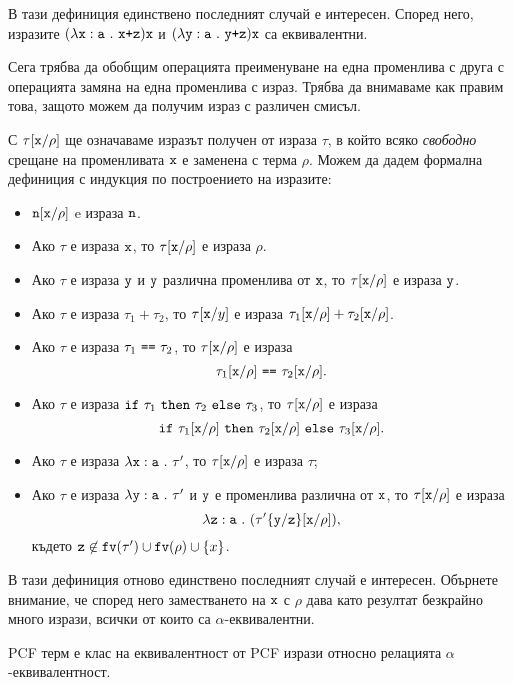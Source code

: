 В тази дефиниция единствено последният случай е интересен.
Според него, изразите $(\lambda\texttt{x}:\texttt{a}\ .\ {\texttt{x+z}})\texttt{x}$ и $(\lambda\texttt{y}:\texttt{a}\ .\ {\texttt{y+z}})\texttt{x}$ са еквивалентни.

Сега трябва да обобщим операцията преименуване на една променлива с друга с
операцията замяна на една променлива с израз.
Трябва да внимаваме как правим това, защото можем да получим
израз с различен смисъл.

С $\tau[\texttt{x}/{\rho}]$ ще означаваме изразът получен от израза $\tau$, в който всяко \emph{свободно} срещане на променливата $\texttt{x}$
е заменена с терма $\rho$. Можем да дадем формална дефиниция с индукция по построението на изразите:
\begin{itemize}
\item
  $\texttt{n}[\texttt{x}/{\rho}]$ e израза $\texttt{n}$.
\item
  Ако $\tau$ е израза $\texttt{x}$, то $\tau[\texttt{x}/{\rho}]$ е израза $\rho$.
\item
  Ако $\tau$ е израза $\texttt{y}$ и $\texttt{y}$ различна променлива от $\texttt{x}$, то $\tau[\texttt{x}/{\rho}]$ е израза $\texttt{y}$.
\item
  Ако $\tau$ е израза $\tau_1 + \tau_2$, то
  $\tau[\texttt{x}/{y}]$ е израза $\tau_1[\texttt{x}/{\rho}] + \tau_2[\texttt{x}/{\rho}]$.
\item
  Ако $\tau$ е израза $\tau_1\ \texttt{==}\ \tau_2$, то $\tau[\texttt{x}/{\rho}]$ е израза
  \[\tau_1\subst{x}{\rho}\ \vv{==}\ \tau_2\subst{x}{\rho}.\]
\item
  Ако $\tau$ е израза $\texttt{if}\ \tau_1\ \texttt{then}\ \tau_2\ \texttt{else}\ \tau_3$, то $\tau[\texttt{x}/{\rho}]$ е израза
  \[\texttt{if}\ \tau_1[\texttt{x}/{\rho}]\ \texttt{then}\ \tau_2[\texttt{x}/{\rho}]\ \texttt{else}\ \tau_3[\texttt{x}/{\rho}].\]
\item
  Ако $\tau$ е израза $\lambda\texttt{x}:\texttt{a}\ .\ {\tau'}$, то
  $\tau[\texttt{x}/{\rho}]$ е израза $\tau$;
\item
  Ако $\tau$ е израза $\lambda\texttt{y}:\texttt{a}\ .\ {\tau'}$ и $\texttt{y}$ е променлива различна от $\texttt{x}$, то
  $\tau[\texttt{x}/{\rho}]$ е израза
  \[\lambda\texttt{z}:\texttt{a}\ .\ {(\tau'\{\texttt{y}/\texttt{z}\}[\texttt{x}/{\rho}])},\]
  където $\texttt{z} \not\in \texttt{fv}(\tau') \cup \texttt{fv}(\rho) \cup \{x\}$.
\end{itemize}

В тази дефиниция отново единствено последният случай е интересен.
Обърнете внимание, че според него заместването на $\texttt{x}$ с $\rho$ дава като резултат безкрайно много
изрази, всички от които са $\alpha$-еквивалентни.


PCF терм е клас на еквивалентност от PCF изрази относно релацията $\alpha$-еквивалентност.

